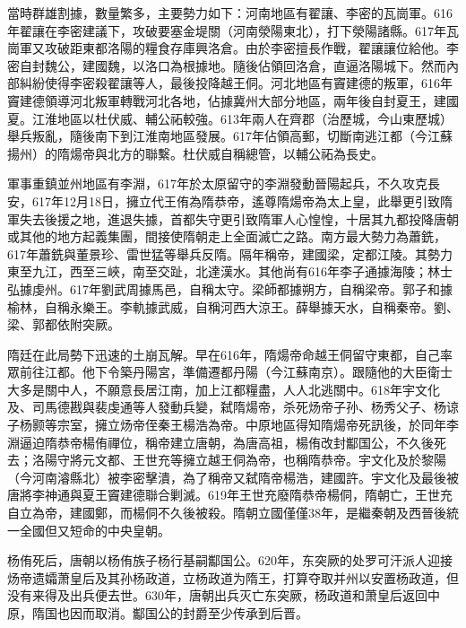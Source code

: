 當時群雄割據，數量繁多，主要勢力如下：河南地區有翟讓、李密的瓦崗軍。616年翟讓在李密建議下，攻破要塞金堤關（河南滎陽東北），打下滎陽諸縣。617年瓦崗軍又攻破距東都洛陽的糧食存庫興洛倉。由於李密擅長作戰，翟讓讓位給他。李密自封魏公，建國魏，以洛口為根據地。隨後佔領回洛倉，直逼洛陽城下。然而內部糾紛使得李密殺翟讓等人，最後投降越王侗。河北地區有竇建德的叛軍，616年竇建德領導河北叛軍轉戰河北各地，佔據冀州大部分地區，兩年後自封夏王，建國夏。江淮地區以杜伏威、輔公祏較強。613年兩人在齊郡（治歷城，今山東歷城）舉兵叛亂，隨後南下到江淮南地區發展。617年佔領高郵，切斷南逃江都（今江蘇揚州）的隋煬帝與北方的聯繫。杜伏威自稱總管，以輔公祏為長史。

軍事重鎮並州地區有李淵，617年於太原留守的李淵發動晉陽起兵，不久攻克長安，617年12月18日，擁立代王侑為隋恭帝，遙尊隋煬帝為太上皇，此舉更引致隋軍失去後援之地，進退失據，首都失守更引致隋軍人心惶惶，十居其九都投降唐朝或其他的地方起義集團，間接使隋朝走上全面滅亡之路。南方最大勢力為蕭銑，617年蕭銑與董景珍、雷世猛等舉兵反隋。隔年稱帝，建國梁，定都江陵。其勢力東至九江，西至三峽，南至交趾，北達漢水。其他尚有616年李子通據海陵；林士弘據虔州。617年劉武周據馬邑，自稱太守。梁師都據朔方，自稱梁帝。郭子和據榆林，自稱永樂王。李軌據武威，自稱河西大涼王。薛舉據天水，自稱秦帝。劉、梁、郭都依附突厥。

隋廷在此局勢下迅速的土崩瓦解。早在616年，隋煬帝命越王侗留守東都，自己率眾前往江都。他下令築丹陽宮，準備遷都丹陽（今江蘇南京）。跟隨他的大臣衛士大多是關中人，不願意長居江南，加上江都糧盡，人人北逃關中。618年宇文化及、司馬德戡與裴虔通等人發動兵變，弑隋煬帝，杀死炀帝子孙、杨秀父子、杨谅子杨颢等宗室，擁立炀帝侄秦王楊浩為帝。中原地區得知隋煬帝死訊後，於同年李淵逼迫隋恭帝楊侑禪位，稱帝建立唐朝，為唐高祖，楊侑改封酅国公，不久後死去；洛陽守將元文都、王世充等擁立越王侗為帝，也稱隋恭帝。宇文化及於黎陽（今河南濬縣北）被李密擊潰，為了稱帝又弑隋帝楊浩，建國許。宇文化及最後被唐將李神通與夏王竇建德聯合剿滅。619年王世充廢隋恭帝楊侗，隋朝亡，王世充自立為帝，建國鄭，而楊侗不久後被殺。隋朝立國僅僅38年，是繼秦朝及西晉後統一全國但又短命的中央皇朝。

杨侑死后，唐朝以杨侑族子杨行基嗣酅国公。620年，东突厥的处罗可汗派人迎接炀帝遗孀萧皇后及其孙杨政道，立杨政道为隋王，打算夺取并州以安置杨政道，但没有来得及出兵便去世。630年，唐朝出兵灭亡东突厥，杨政道和萧皇后返回中原，隋国也因而取消。酅国公的封爵至少传承到后晋。

